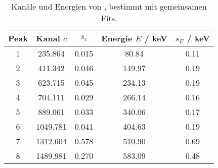 \begin{table}[H]
\caption{Kan\"ale und Energien von \th, bestimmt mit gemeinsamen Fits.}
\begin{center}
\begin{tabular}{|c|c|c|c|c|}
  \hline
  Peak & Kanal $c$ & $s_c$ & Energie $E$ / keV & $s_E$ / keV \\ \hline
   1 & 235.864 & 0.015 & 80.84 & 0.11 \\ \hline
   2 & 411.342 & 0.046 & 149.97 & 0.19 \\ \hline
   3 & 623.715 & 0.045 & 234.13 & 0.19 \\ \hline
   4 & 704.111 & 0.029 & 266.14 & 0.16 \\ \hline
   5 & 889.061 & 0.033 & 340.06 & 0.17 \\ \hline
   6 & 1049.781 & 0.041 & 404.63 & 0.19 \\ \hline
   7 & 1312.604 & 0.578 & 510.90 & 0.69 \\ \hline
   8 & 1489.981 & 0.270 & 583.09 & 0.48 \\ \hline
\end{tabular}
\end{center}
\label{tab:th:multi}
\end{table}
